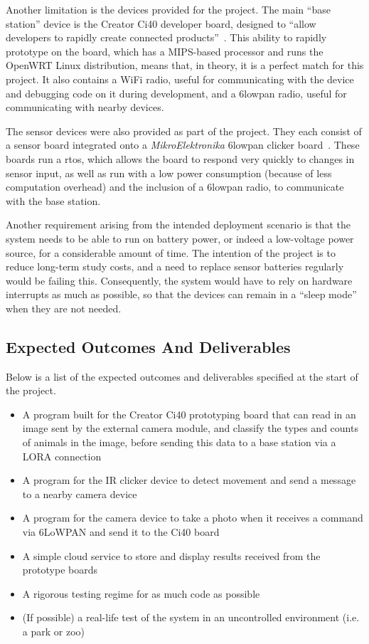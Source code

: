 Another limitation is the devices provided for the project. The main ``base
station'' device is the Creator Ci40 developer board, designed to ``allow
developers to rapidly create connected products''~\cite{creatorci40}. This
ability to rapidly prototype on the board, which has a MIPS-based processor
and runs the OpenWRT Linux distribution, means that, in theory, it is a
perfect match for this project. It also contains a WiFi radio, useful for
communicating with the device and debugging code on it during development,
and a \gls{6lowpan} radio, useful for communicating with nearby devices.

The sensor devices were also provided as part of the project. They each
consist of a sensor board integrated onto a \textit{MikroElektronika}
\gls{6lowpan} clicker board~\cite{mikroeclick}. These boards run a
\acrfull{rtos}, which allows the board to respond very quickly to changes in
sensor input, as well as run with a low power consumption (because of less
computation overhead) and the inclusion of a \gls{6lowpan} radio, to
communicate with the base station.

Another requirement arising from the intended deployment scenario is that the
system needs to be able to run on battery power, or indeed a low-voltage
power source, for a considerable amount of time. The intention of the project
is to reduce long-term study costs, and a need to replace sensor batteries
regularly would be failing this. Consequently, the system would have to rely
on hardware interrupts as much as possible, so that the devices can remain in
a ``sleep mode'' when they are not needed.

\subsection{Expected Outcomes And Deliverables}
Below is a list of the expected outcomes and deliverables specified at the
start of the project.

\begin{itemize}
    \item A program built for the Creator Ci40 prototyping board that can read
        in an image sent by the external camera module, and classify the types
        and counts of animals in the image, before sending this data to a base
        station via a LORA connection
    \item A program for the IR clicker device to detect movement and send a
        message to a nearby camera device
    \item A program for the camera device to take a photo when it receives a
        command via 6LoWPAN and send it to the Ci40 board
    \item A simple cloud service to store and display results received from the
        prototype boards
    \item A rigorous testing regime for as much code as possible
    \item (If possible) a real-life test of the system in an uncontrolled
        environment (i.e. a park or zoo)
\end{itemize}

